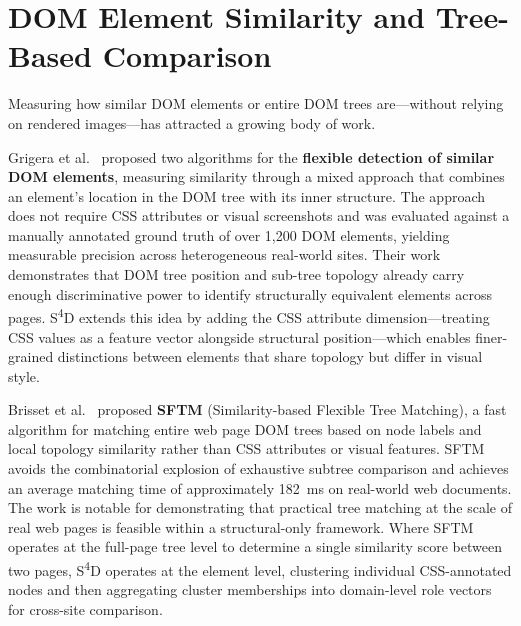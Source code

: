 \section{DOM Element Similarity and Tree-Based Comparison}
\label{sec:dom-similarity}

Measuring how similar DOM elements or entire DOM trees are---without relying on rendered images---has attracted a growing body of work.

Grigera et al.~\cite{grigera2022domflexible} proposed two algorithms for the \textbf{flexible detection of similar DOM elements}, measuring similarity through a mixed approach that combines an element's location in the DOM tree with its inner structure. The approach does not require CSS attributes or visual screenshots and was evaluated against a manually annotated ground truth of over 1,200 DOM elements, yielding measurable precision across heterogeneous real-world sites. Their work demonstrates that DOM tree position and sub-tree topology already carry enough discriminative power to identify structurally equivalent elements across pages. S\textsuperscript{4}D extends this idea by adding the CSS attribute dimension---treating CSS values as a feature vector alongside structural position---which enables finer-grained distinctions between elements that share topology but differ in visual style.

Brisset et al.~\cite{brisset2022sftm} proposed \textbf{SFTM} (Similarity-based Flexible Tree Matching), a fast algorithm for matching entire web page DOM trees based on node labels and local topology similarity rather than CSS attributes or visual features. SFTM avoids the combinatorial explosion of exhaustive subtree comparison and achieves an average matching time of approximately 182~ms on real-world web documents. The work is notable for demonstrating that practical tree matching at the scale of real web pages is feasible within a structural-only framework. Where SFTM operates at the full-page tree level to determine a single similarity score between two pages, S\textsuperscript{4}D operates at the element level, clustering individual CSS-annotated nodes and then aggregating cluster memberships into domain-level role vectors for cross-site comparison.

